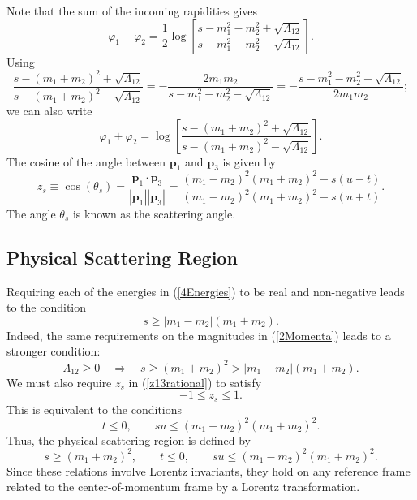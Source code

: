 Note that the sum of the incoming rapidities gives
\begin{equation}
	\varphi_{1} + \varphi_{2} = \frac{1}{2} \log{\left[ \frac{s - m_{1}^{2} - m_{2}^{2} + \sqrt{\Lambda_{12}}}{s - m_{1}^{2} - m_{2}^{2} - \sqrt{\Lambda_{12}}} \right]}.
\end{equation}
Using
\begin{equation}
	\frac{s - (m_{1} + m_{2})^{2} + \sqrt{\Lambda_{12}}}{s - (m_{1} + m_{2})^{2} - \sqrt{\Lambda_{12}}} = -\frac{2m_{1}m_{2}}{s - m_{1}^{2} - m_{2}^{2} - \sqrt{\Lambda_{12}}} = -\frac{s - m_{1}^{2} - m_{2}^{2} + \sqrt{\Lambda_{12}}}{2m_{1}m_{2}};
\end{equation}
we can also write
\begin{equation}
	\varphi_{1} + \varphi_{2} = \log{\left[ \frac{s - (m_{1} + m_{2})^{2} + \sqrt{\Lambda_{12}}}{s - (m_{1} + m_{2})^{2} - \sqrt{\Lambda_{12}}} \right]}.
	\label{rap12}
\end{equation}
The cosine of the angle between $\mathbf{p}_{1}$ and $\mathbf{p}_{3}$ is given by
\begin{equation}
	z_{s} \equiv \cos(\theta_{s}) = \frac{\mathbf{p}_{1} \cdot \mathbf{p}_{3}}{|\mathbf{p}_{1}| |\mathbf{p}_{3}|} = \frac{(m_{1} - m_{2})^{2} (m_{1} + m_{2})^{2} - s (u - t)}{(m_{1} - m_{2})^{2} (m_{1} + m_{2})^{2} - s (u + t)}.
	\label{z13rational}
\end{equation}
The angle $\theta_{s}$ is known as the scattering angle.
\subsection{Physical Scattering Region}
Requiring each of the energies in (\ref{4Energies}) to be real and non-negative leads to the condition
\begin{equation}
	s \geq |m_{1} - m_{2}| (m_{1} + m_{2}).
\end{equation}
Indeed, the same requirements on the magnitudes in (\ref{2Momenta}) leads to a stronger condition:
\begin{equation}
	\Lambda_{12} \geq 0 \quad \Longrightarrow \quad s \geq (m_{1} + m_{2})^{2} > |m_{1} - m_{2}| (m_{1} + m_{2}).
\end{equation}
We must also require $z_{s}$ in (\ref{z13rational}) to satisfy
\begin{equation}
	{-1} \leq z_{s} \leq 1.
\end{equation}
This is equivalent to the conditions
\begin{equation}
	t \leq 0, \qquad s u \leq (m_{1} - m_{2})^{2} (m_{1} + m_{2})^{2}.
\end{equation}
Thus, the physical scattering region is defined by
\begin{equation}
	s \geq (m_{1} + m_{2})^{2}, \qquad t \leq 0, \qquad s u \leq (m_{1} - m_{2})^{2} (m_{1} + m_{2})^{2}.
\end{equation}
Since these relations involve Lorentz invariants, they hold on any reference frame related to the center-of-momentum frame by a Lorentz transformation.